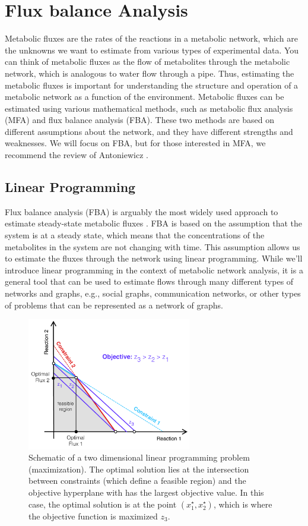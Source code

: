 \documentclass{article}[11pt]
\begin{document}
\section{Flux balance Analysis}\label{sec:FBA}
Metabolic fluxes are the rates of the reactions in a metabolic network, which are the unknowns we want to estimate from various types of experimental data.
You can think of metabolic fluxes as the flow of metabolites through the metabolic network, which is analogous to water flow through a pipe.
Thus, estimating the metabolic fluxes is important for understanding the structure and operation of a metabolic network as a function of the environment.
Metabolic fluxes can be estimated using various mathematical methods, such as metabolic flux analysis (MFA) and flux balance analysis (FBA).
These two methods are based on different assumptions about the network, and they have different strengths and weaknesses.
We will focus on FBA, but for those interested in MFA, we recommend the review of Antoniewicz \cite{ANTONIEWICZ20212}.

\subsection{Linear Programming}\label{sec:linear-programming}
Flux balance analysis (FBA) is arguably the most widely used approach to estimate steady-state metabolic fluxes \cite{Orth:2010aa}. 
FBA is based on the assumption that the system is at a steady state, which means that the concentrations of the metabolites in the system are not changing with time.
This assumption allows us to estimate the fluxes through the network using linear programming.
While we'll introduce linear programming in the context of metabolic network analysis, 
it is a general tool that can be used to estimate flows through many different types of networks and graphs, e.g., social graphs, communication networks, or other types of problems that can be represented as a network of graphs.

\begin{figure}
  \centering
\includegraphics[width=0.64\textwidth]{./figs/Fig-LinearProgramming-Schematic.pdf}
\caption{Schematic of a two dimensional linear programming problem (maximization).
The optimal solution lies at the intersection between constraints (which define a feasible region) and the objective hyperplane with has the largest objective value.
In this case, the optimal solution is at the point $(x_{1}^{\star},x_{2}^{\star})$, which is where the objective function is maximized $z_{3}$.
}\label{fig:LinearProgramming-Schematic}
\end{figure}
\end{document}
